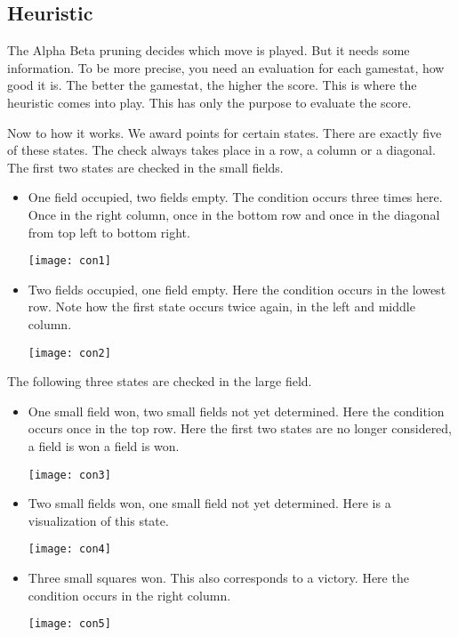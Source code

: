 \subsection{Heuristic}
The Alpha Beta pruning decides which move is played. But it needs some information. To be more precise, you need an evaluation for each gamestat, how good it is. The better the gamestat, the higher the score. This is where the heuristic comes into play. This has only the purpose to evaluate the score.

Now to how it works. We award points for certain states. There are exactly five of these states. The check always takes place in a row, a column or a diagonal. The first two states are checked in the small fields.
\begin{itemize}
\item One field occupied, two fields empty. The condition occurs three times here. Once in the right column, once in the bottom row and once in the diagonal from top left to bottom right.
\begin{fixedpic}
	\texttt{[image: con1]}
\end{fixedpic}
\item Two fields occupied, one field empty. Here the condition occurs in the lowest row. Note how the first state occurs twice again, in the left and middle column.
\begin{fixedpic}
	\texttt{[image: con2]}
\end{fixedpic}
\end{itemize}
The following three states are checked in the large field.
\begin{itemize}
\item One small field won, two small fields not yet determined. Here the condition occurs once in the top row. Here the first two states are no longer considered, a field is won a field is won.
\begin{fixedpic}
	\texttt{[image: con3]}
\end{fixedpic}
\item Two small fields won, one small field not yet determined. Here is a visualization of this state.
\begin{fixedpic}
	\centering
	\texttt{[image: con4]}
\end{fixedpic}
\item Three small squares won. This also corresponds to a victory. Here the condition occurs in the right column.
\begin{fixedpic}
	\centering
	\texttt{[image: con5]}
\end{fixedpic}
\end{itemize}
